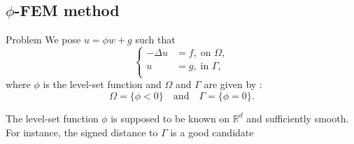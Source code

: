 \documentclass[compress,10pt,xcolor={table,dvipsnames},t]{beamer}
\begin{document}
	\subsection{$\phi$-FEM method}
	
	\begin{frame}{Problem}
		We pose $u=\phi w+g$ such that
		$$\left\{\begin{aligned}
			-\Delta u &= f, \; \text{on } \Omega, \\
			u&=g, \; \text{in } \Gamma, \\
		\end{aligned}\right.$$
		where $\phi$ is the level-set function and $\Omega$ and $\Gamma$ are given by :
		$$
		\Omega=\{\phi < 0\} \quad \text{and} \quad \Gamma=\{\phi = 0\}.$$
		\begin{center}
		\end{center}
		The level-set function $\phi$ is supposed to be known on $\mathbb{R}^d$ and sufficiently smooth. \\
		For instance, the signed distance to $\Gamma$ is a good candidate
	\end{frame}
	
\end{document}
